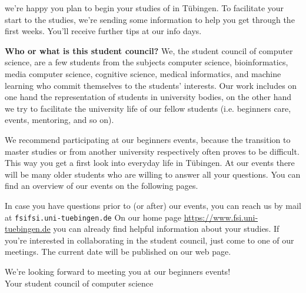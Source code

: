 \thispagestyle{firststyle}
we're happy you plan to begin your studies of \studiengang in Tübingen.
To facilitate your start to the studies, we're sending some information to help you get through the first weeks.
You'll receive further tips at our info days.

\textbf{Who or what is this \glqq student council\grqq?} We, the student council of computer science, are a few students from the subjects computer science, bioinformatics, media computer science, cognitive science, medical informatics, and machine learning who commit themselves to the students' interests. Our work includes on one hand the representation of students in university bodies, on the other hand we try to facilitate the university life of our fellow students (i.e. beginners care,
events, mentoring, and so on).

\ifmaster
    \ifml
We recommend participating at our beginners events, because the transition to master studies or from another university respectively often proves to be difficult. This way you get a first look into everyday life in Tübingen.
    \fi
\fi 
At our events there will be many older students who are willing to answer all your questions. You can find an overview of our events on the following pages.

In case you have questions prior to (or after) our events, you can reach us by mail at \texttt{fsi\At fsi.uni-tuebingen.de}
On our home page
\url{https://www.fsi.uni-tuebingen.de} you can already find helpful information about your studies. If you're interested in collaborating in the student council, just come to one of our meetings. The current date will be published on our web page.

We're looking forward to meeting you at our beginners events!\\
Your student council of computer science
\vfill

\noindent{}
